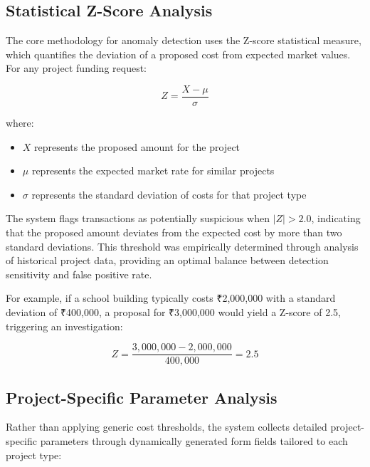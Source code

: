 \documentclass[12pt,a4paper]{report}
\begin{document}
\subsection{Statistical Z-Score Analysis}
\indent \indent The core methodology for anomaly detection uses the Z-score statistical measure, which quantifies the deviation of a proposed cost from expected market values. For any project funding request:

\begin{equation}
Z = \frac{X - \mu}{\sigma}
\end{equation}

\noindent where:
\begin{itemize}
    \item $X$ represents the proposed amount for the project
    \item $\mu$ represents the expected market rate for similar projects
    \item $\sigma$ represents the standard deviation of costs for that project type
\end{itemize}

\noindent The system flags transactions as potentially suspicious when $|Z| > 2.0$, indicating that the proposed amount deviates from the expected cost by more than two standard deviations. This threshold was empirically determined through analysis of historical project data, providing an optimal balance between detection sensitivity and false positive rate.

\indent For example, if a school building typically costs ₹2,000,000 with a standard deviation of ₹400,000, a proposal for ₹3,000,000 would yield a Z-score of 2.5, triggering an investigation:

\begin{equation}
Z = \frac{3,000,000 - 2,000,000}{400,000} = 2.5
\end{equation}

\subsection{Project-Specific Parameter Analysis}
\indent \indent Rather than applying generic cost thresholds, the system collects detailed project-specific parameters through dynamically generated form fields tailored to each project type:
\end{document}
